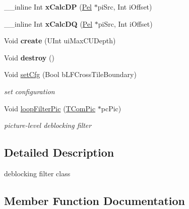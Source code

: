 \begin{DoxyCompactItemize}
\item 
\mbox{\label{class_t_com_loop_filter_a9962843128522e7a58a7930af003cd2f}} 
\+\_\+\+\_\+inline Int {\bfseries x\+Calc\+DP} (\hyperlink{_type_def_8h_af92141699657699b4b547be0c8517541}{Pel} $\ast$pi\+Src, Int i\+Offset)
\item 
\mbox{\label{class_t_com_loop_filter_a3652488c97ffec93500d5f86685bf88e}} 
\+\_\+\+\_\+inline Int {\bfseries x\+Calc\+DQ} (\hyperlink{_type_def_8h_af92141699657699b4b547be0c8517541}{Pel} $\ast$pi\+Src, Int i\+Offset)
\item 
\mbox{\label{class_t_com_loop_filter_a87e2f4e740c16a044c7837ef491c3353}} 
Void {\bfseries create} (U\+Int ui\+Max\+C\+U\+Depth)
\item 
\mbox{\label{class_t_com_loop_filter_a9fe0a2eaeadc0b34efcc91083bce5641}} 
Void {\bfseries destroy} ()
\item 
\mbox{\label{class_t_com_loop_filter_a714ba8dc0dfbac4328ec597560f14e1f}} 
Void \hyperlink{class_t_com_loop_filter_a714ba8dc0dfbac4328ec597560f14e1f}{set\+Cfg} (Bool b\+L\+F\+Cross\+Tile\+Boundary)
\begin{DoxyCompactList}\small\item\em set configuration \end{DoxyCompactList}\item 
Void \hyperlink{class_t_com_loop_filter_ab4038985585a766477b8f58afdfbb2ff}{loop\+Filter\+Pic} (\hyperlink{class_t_com_pic}{T\+Com\+Pic} $\ast$pc\+Pic)
\begin{DoxyCompactList}\small\item\em picture-\/level deblocking filter \end{DoxyCompactList}\end{DoxyCompactItemize}


\subsection{Detailed Description}
deblocking filter class 

\subsection{Member Function Documentation}
\mbox{\label{class_t_com_loop_filter_ab4038985585a766477b8f58afdfbb2ff}} 
